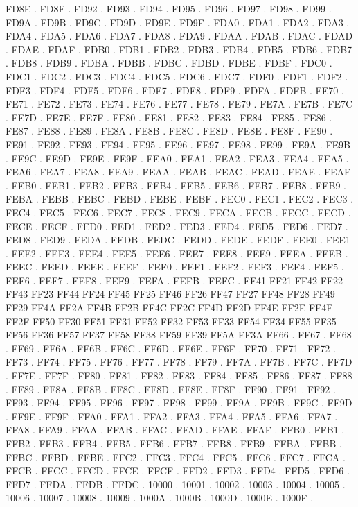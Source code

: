 FD8E .
FD8F .
FD92 .
FD93 .
FD94 .
FD95 .
FD96 .
FD97 .
FD98 .
FD99 .
FD9A .
FD9B .
FD9C .
FD9D .
FD9E .
FD9F .
FDA0 .
FDA1 .
FDA2 .
FDA3 .
FDA4 .
FDA5 .
FDA6 .
FDA7 .
FDA8 .
FDA9 .
FDAA .
FDAB .
FDAC .
FDAD .
FDAE .
FDAF .
FDB0 .
FDB1 .
FDB2 .
FDB3 .
FDB4 .
FDB5 .
FDB6 .
FDB7 .
FDB8 .
FDB9 .
FDBA .
FDBB .
FDBC .
FDBD .
FDBE .
FDBF .
FDC0 .
FDC1 .
FDC2 .
FDC3 .
FDC4 .
FDC5 .
FDC6 .
FDC7 .
FDF0 .
FDF1 .
FDF2 .
FDF3 .
FDF4 .
FDF5 .
FDF6 .
FDF7 .
FDF8 .
FDF9 .
FDFA .
FDFB .
FE70 .
FE71 .
FE72 .
FE73 .
FE74 .
FE76 .
FE77 .
FE78 .
FE79 .
FE7A .
FE7B .
FE7C .
FE7D .
FE7E .
FE7F .
FE80 .
FE81 .
FE82 .
FE83 .
FE84 .
FE85 .
FE86 .
FE87 .
FE88 .
FE89 .
FE8A .
FE8B .
FE8C .
FE8D .
FE8E .
FE8F .
FE90 .
FE91 .
FE92 .
FE93 .
FE94 .
FE95 .
FE96 .
FE97 .
FE98 .
FE99 .
FE9A .
FE9B .
FE9C .
FE9D .
FE9E .
FE9F .
FEA0 .
FEA1 .
FEA2 .
FEA3 .
FEA4 .
FEA5 .
FEA6 .
FEA7 .
FEA8 .
FEA9 .
FEAA .
FEAB .
FEAC .
FEAD .
FEAE .
FEAF .
FEB0 .
FEB1 .
FEB2 .
FEB3 .
FEB4 .
FEB5 .
FEB6 .
FEB7 .
FEB8 .
FEB9 .
FEBA .
FEBB .
FEBC .
FEBD .
FEBE .
FEBF .
FEC0 .
FEC1 .
FEC2 .
FEC3 .
FEC4 .
FEC5 .
FEC6 .
FEC7 .
FEC8 .
FEC9 .
FECA .
FECB .
FECC .
FECD .
FECE .
FECF .
FED0 .
FED1 .
FED2 .
FED3 .
FED4 .
FED5 .
FED6 .
FED7 .
FED8 .
FED9 .
FEDA .
FEDB .
FEDC .
FEDD .
FEDE .
FEDF .
FEE0 .
FEE1 .
FEE2 .
FEE3 .
FEE4 .
FEE5 .
FEE6 .
FEE7 .
FEE8 .
FEE9 .
FEEA .
FEEB .
FEEC .
FEED .
FEEE .
FEEF .
FEF0 .
FEF1 .
FEF2 .
FEF3 .
FEF4 .
FEF5 .
FEF6 .
FEF7 .
FEF8 .
FEF9 .
FEFA .
FEFB .
FEFC .
FF41 FF21
FF42 FF22
FF43 FF23
FF44 FF24
FF45 FF25
FF46 FF26
FF47 FF27
FF48 FF28
FF49 FF29
FF4A FF2A
FF4B FF2B
FF4C FF2C
FF4D FF2D
FF4E FF2E
FF4F FF2F
FF50 FF30
FF51 FF31
FF52 FF32
FF53 FF33
FF54 FF34
FF55 FF35
FF56 FF36
FF57 FF37
FF58 FF38
FF59 FF39
FF5A FF3A
FF66 .
FF67 .
FF68 .
FF69 .
FF6A .
FF6B .
FF6C .
FF6D .
FF6E .
FF6F .
FF70 .
FF71 .
FF72 .
FF73 .
FF74 .
FF75 .
FF76 .
FF77 .
FF78 .
FF79 .
FF7A .
FF7B .
FF7C .
FF7D .
FF7E .
FF7F .
FF80 .
FF81 .
FF82 .
FF83 .
FF84 .
FF85 .
FF86 .
FF87 .
FF88 .
FF89 .
FF8A .
FF8B .
FF8C .
FF8D .
FF8E .
FF8F .
FF90 .
FF91 .
FF92 .
FF93 .
FF94 .
FF95 .
FF96 .
FF97 .
FF98 .
FF99 .
FF9A .
FF9B .
FF9C .
FF9D .
FF9E .
FF9F .
FFA0 .
FFA1 .
FFA2 .
FFA3 .
FFA4 .
FFA5 .
FFA6 .
FFA7 .
FFA8 .
FFA9 .
FFAA .
FFAB .
FFAC .
FFAD .
FFAE .
FFAF .
FFB0 .
FFB1 .
FFB2 .
FFB3 .
FFB4 .
FFB5 .
FFB6 .
FFB7 .
FFB8 .
FFB9 .
FFBA .
FFBB .
FFBC .
FFBD .
FFBE .
FFC2 .
FFC3 .
FFC4 .
FFC5 .
FFC6 .
FFC7 .
FFCA .
FFCB .
FFCC .
FFCD .
FFCE .
FFCF .
FFD2 .
FFD3 .
FFD4 .
FFD5 .
FFD6 .
FFD7 .
FFDA .
FFDB .
FFDC .
10000 .
10001 .
10002 .
10003 .
10004 .
10005 .
10006 .
10007 .
10008 .
10009 .
1000A .
1000B .
1000D .
1000E .
1000F .
